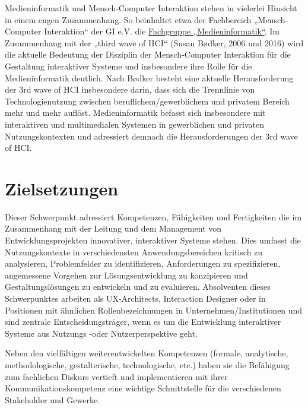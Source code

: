 Medieninformatik und Mensch-Computer Interaktion stehen in vielerlei
Hinsicht in einem engen Zusammenhang. So beinhaltet etwa der Fachbereich
„Mensch-Computer Interaktion`` der GI e.V. die
\href{http://fb-mci.gi.de/mensch-computer-interaktion-mci/fachgruppen/medieninformatik.html}{Fachgruppe
„Medieninformatik``}. Im Zusammenhang mit der „third wave of HCI``
(Susan Bødker, 2006 und 2016) wird die aktuelle Bedeutung der Disziplin
der Mensch-Computer Interaktion für die Gestaltung interaktiver Systeme
und insbesondere ihre Rolle für die Medieninformatik deutlich. Nach
Bødker besteht eine aktuelle Herausforderung der 3rd wave of HCI
insbesondere darin, dass sich die Trennlinie von Technologienutzung
zwischen beruflichem/gewerblichem und privatem Bereich mehr und mehr
auflöst. Medieninformatik befasst sich insbesondere mit interaktiven und
multimedialen Systemen in gewerblichen und privaten Nutzungskontexten
und adressiert demnach die Herausforderungen der 3rd wave of HCI.

\section*{Zielsetzungen\label{/mi-2017/modulbeschreibungen-master/schwerpunkt-human-computer-interaction}}\label{zielsetzungenpathlabelmi-2017modulbeschreibungen-masterschwerpunkt-human-computer-interaction}

Dieser Schwerpunkt adressiert Kompetenzen, Fähigkeiten und Fertigkeiten
die im Zusammenhang mit der Leitung und dem Management von
Entwicklungsprojekten innovativer, interaktiver Systeme stehen. Dies
umfasst die Nutzungskontexte in verschiedensten Anwendungsbereichen
kritisch zu analysieren, Problemfelder zu identifizieren, Anforderungen
zu spezifizieren, angemessene Vorgehen zur Lösungsentwicklung zu
konzipieren und Gestaltungslösungen zu entwickeln und zu evaluieren.
Absolventen dieses Schwerpunktes arbeiten als UX-Architects, Interaction
Designer oder in Positionen mit ähnlichen Rollenbezeichnungen in
Unternehmen/Institutionen und sind zentrale Entscheidungsträger, wenn es
um die Entwicklung interaktiver Systeme aus Nutzungs -oder
Nutzerperspektive geht.

Neben den vielfältigen weiterentwickelten Kompetenzen (formale,
analytische, methodologische, gestalterische, technologische, etc.)
haben sie die Befähigung zum fachlichen Diskurs vertieft und
implementieren mit ihrer Kommunikationskompetenz eine wichtige
Schnittstelle für die verschiedenen Stakeholder und Gewerke.


